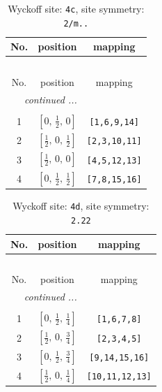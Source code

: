 \documentclass[fleqn,8pt]{jsarticle}
\begin{document}
\renewcommand{\arraystretch}{1.2}
\begin{longtable}{ccc}
\caption{Wyckoff site: {\tt 4c}, site symmetry: {\tt 2/m..}}
 \\
 \hline \hline
No. & position & mapping \\ \hline \endfirsthead

\multicolumn{2}{l}{\tablename\ \thetable{}} \\
 \hline \hline
No. & position & mapping \\ \hline \endhead

 \hline \hline
\multicolumn{2}{r}{\footnotesize\it continued ...} \\ \endfoot

 \hline \hline
\multicolumn{2}{r}{} \\ \endlastfoot

1 & $\left[ 0,\, \frac{1}{2},\, 0 \right]$ & {\tt [1,6,9,14]} \\ \hline
2 & $\left[ \frac{1}{2},\, 0,\, \frac{1}{2} \right]$ & {\tt [2,3,10,11]} \\ \hline
3 & $\left[ \frac{1}{2},\, 0,\, 0 \right]$ & {\tt [4,5,12,13]} \\ \hline
4 & $\left[ 0,\, \frac{1}{2},\, \frac{1}{2} \right]$ & {\tt [7,8,15,16]} \\
\end{longtable}
\renewcommand{\arraystretch}{1.2}
\begin{longtable}{ccc}
\caption{Wyckoff site: {\tt 4d}, site symmetry: {\tt 2.22}}
 \\
 \hline \hline
No. & position & mapping \\ \hline \endfirsthead

\multicolumn{2}{l}{\tablename\ \thetable{}} \\
 \hline \hline
No. & position & mapping \\ \hline \endhead

 \hline \hline
\multicolumn{2}{r}{\footnotesize\it continued ...} \\ \endfoot

 \hline \hline
\multicolumn{2}{r}{} \\ \endlastfoot

1 & $\left[ 0,\, \frac{1}{2},\, \frac{1}{4} \right]$ & {\tt [1,6,7,8]} \\ \hline
2 & $\left[ \frac{1}{2},\, 0,\, \frac{3}{4} \right]$ & {\tt [2,3,4,5]} \\ \hline
3 & $\left[ 0,\, \frac{1}{2},\, \frac{3}{4} \right]$ & {\tt [9,14,15,16]} \\ \hline
4 & $\left[ \frac{1}{2},\, 0,\, \frac{1}{4} \right]$ & {\tt [10,11,12,13]} \\
\end{longtable}
\end{document}
